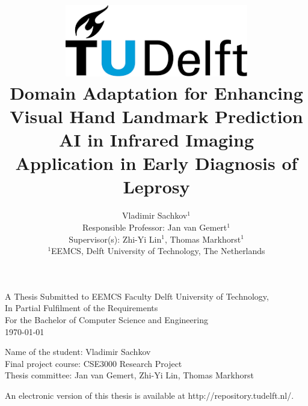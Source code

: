 \title{
    \includegraphics[width=8cm, keepaspectratio]{tudelftlogo.png}\\
    \vspace*{2cm}
    \textbf{
        Domain Adaptation for Enhancing Visual Hand Landmark Prediction AI in Infrared Imaging\\
        {\large Application in Early Diagnosis of Leprosy}
    }\\
    \vspace*{1cm}
}

\author{
    Vladimir Sachkov$^1$\\
    \hfill \break
    Responsible Professor: Jan van Gemert$^1$\\
    Supervisor(s): Zhi-Yi Lin$^1$, Thomas Markhorst$^1$\\
    \affiliations
    {\large 
        \hfill \break
        $^1$EEMCS, Delft University of Technology, The Netherlands
    }\\
}

\maketitle

\let\clearpagebackup\clearpage
\renewcommand{\clearpage}{ }

\onecolumn

\vspace*{2cm}
\begin{center}
    A Thesis Submitted to EEMCS Faculty Delft University of Technology,\\
    In Partial Fulfilment of the Requirements\\
    For the Bachelor of Computer Science and Engineering\\
    \today
\end{center}

\vspace*{3cm}

\noindent
{\small
Name of the student: Vladimir Sachkov\\
Final project course: CSE3000 Research Project\\
Thesis committee: Jan van Gemert, Zhi-Yi Lin, Thomas Markhorst\\
}
\vfill

\begin{center}
    An electronic version of this thesis is available at http://repository.tudelft.nl/.
\end{center}

\twocolumn
\let\clearpage\clearpagebackup  
\clearpage